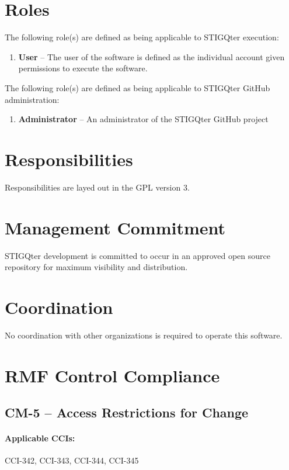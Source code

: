 \documentclass[letterpaper, 10pt, twoside]{article}
\begin{document}
\section{Roles}
\label{sec:roles}

The following role(s) are defined as being applicable to STIGQter execution:
\begin{enumerate}
	\item \textbf{User} -- The user of the software is defined as the individual account given permissions to execute the software.
\end{enumerate}

The following role(s) are defined as being applicable to STIGQter GitHub administration:
\begin{enumerate}
	\item \textbf{Administrator} -- An administrator of the STIGQter GitHub project
\end{enumerate}

\section{Responsibilities}
\label{sec:responsibilities}

Responsibilities are layed out in the GPL version 3.

\section{Management Commitment}

STIGQter development is committed to occur in an approved open source repository for maximum visibility and distribution.

\section{Coordination}

No coordination with other organizations is required to operate this software.

\section{RMF Control Compliance}

\subsection{CM-5 -- Access Restrictions for Change}

\paragraph{Applicable CCIs:} CCI-342, CCI-343, CCI-344, CCI-345
\end{document}

